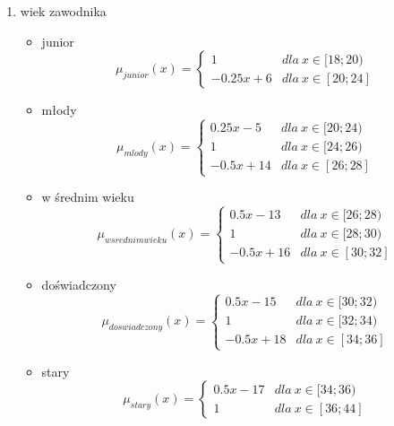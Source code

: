 \documentclass{classrep}
\begin{document}
\begin{enumerate}
    \item wiek zawodnika
    \begin{itemize}
        \item junior
        \begin{equation}
            \mu_{junior}(x) = \left\{\begin{matrix} 1 & dla \: x\in[18;20) \\ -0.25x + 6 & dla \: x\in [20; 24] \end{matrix}\right.
        \end{equation}
        \item młody
        \begin{equation}
            \mu_{mlody}(x) = \left\{\begin{matrix} 0.25x-5 & dla \: x\in[20;24) \\ 1 & dla \: x\in [24; 26) \\ -0.5x + 14 & dla \: x\in[26;28] \end{matrix}\right.
        \end{equation}
        \item w średnim wieku
        \begin{equation}
            \mu_{w srednim wieku}(x) = \left\{\begin{matrix} 0.5x - 13 & dla \: x\in[26;28) \\ 1 & dla \: x\in [28; 30) \\ -0.5x + 16 & dla \: x\in[30;32] \end{matrix}\right.
        \end{equation}
        \item doświadczony
        \begin{equation}
            \mu_{doswiadczony}(x) = \left\{\begin{matrix} 0.5x - 15 & dla \: x\in[30;32) \\ 1 & dla \: x\in [32; 34) \\ -0.5x + 18 & dla \: x\in[34;36] \end{matrix}\right.
        \end{equation}
        \item stary
        \begin{equation}
            \mu_{stary}(x) = \left\{\begin{matrix} 0.5x - 17 & dla \: x\in[34;36) \\ 1 & dla \: x\in [36; 44] \end{matrix}\right.
        \end{equation}

\end{itemize}
\end{enumerate}
\end{document}
